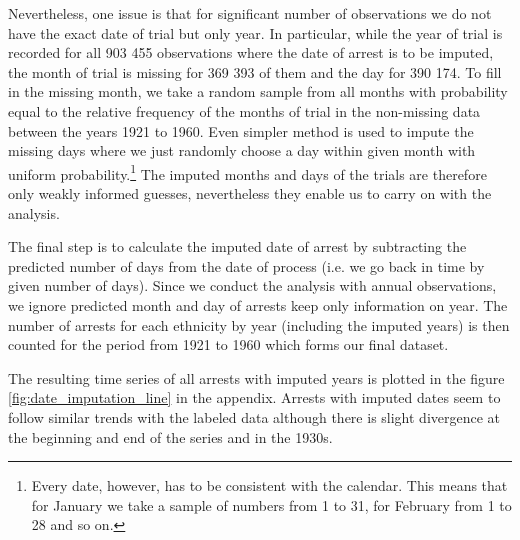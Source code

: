 Nevertheless,  one issue is that for significant number of observations we do not have the exact date of trial but only year. In particular, 
while the year of trial is recorded for all 903 455 observations where the date of arrest is to be imputed, the month of trial is missing for 369 393 of them and the day for 390 174. 
To fill in the missing month, we take a random sample from all months with probability equal to the relative frequency of the months of trial in the non-missing data between the years 1921 to 1960. 
Even simpler method is used to impute the missing days where we just randomly choose a day within given month with uniform probability.\footnote{Every date, however, has to be consistent with the calendar. This means that for January we take a sample of numbers from 1 to 31, for February from 1 to 28 and so on. } 
The imputed months and days of the trials are therefore only weakly informed guesses, nevertheless they enable us to carry on with the analysis. 

The final step is to calculate the imputed date of arrest by subtracting the predicted number of days from the date of process (i.e. we go back in time by given number of days). Since we conduct the analysis with annual observations, we ignore predicted month and day of arrests  keep only information on year. The number of arrests for each ethnicity by year (including the imputed years) is then counted for the period from 1921 to 1960 which forms our final dataset. 

The resulting time series of all arrests with imputed years is plotted in the figure \ref{fig:date_imputation_line} in the appendix. Arrests with imputed dates seem to follow  similar trends with the labeled data  although there is slight divergence at the beginning and end of the series and in the 1930s.
